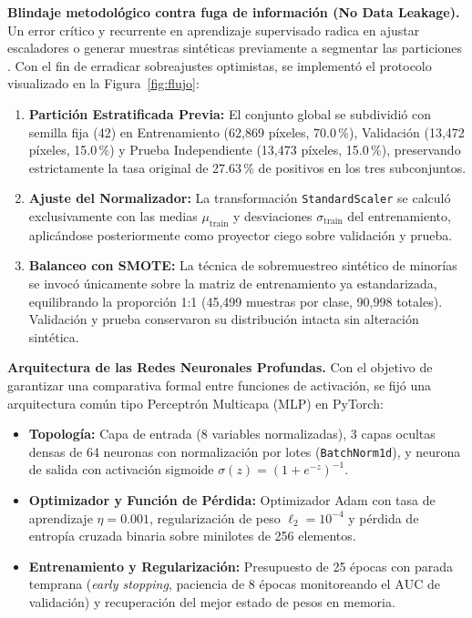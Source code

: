 \documentclass[10pt,twocolumn,letterpaper]{article}
\newcommand{\AUC}{\mathrm{AUC}}
\begin{document}
\textbf{Blindaje metodológico contra fuga de información (No Data Leakage).}
Un error crítico y recurrente en aprendizaje supervisado radica en ajustar escaladores o generar muestras sintéticas previamente a segmentar las particiones \citep{chawla2002}. Con el fin de erradicar sobreajustes optimistas, se implementó el protocolo visualizado en la Figura~\ref{fig:flujo}:
\begin{enumerate}[leftmargin=1.2em]
  \item \textbf{Partición Estratificada Previa:} El conjunto global se subdividió con semilla fija (42) en Entrenamiento (62{,}869 píxeles, 70.0\,\%), Validación (13{,}472 píxeles, 15.0\,\%) y Prueba Independiente (13{,}473 píxeles, 15.0\,\%), preservando estrictamente la tasa original de 27.63\,\% de positivos en los tres subconjuntos.
  \item \textbf{Ajuste del Normalizador:} La transformación \texttt{StandardScaler} se calculó exclusivamente con las medias $\mu_{\mathrm{train}}$ y desviaciones $\sigma_{\mathrm{train}}$ del entrenamiento, aplicándose posteriormente como proyector ciego sobre validación y prueba.
  \item \textbf{Balanceo con SMOTE:} La técnica de sobremuestreo sintético de minorías se invocó únicamente sobre la matriz de entrenamiento ya estandarizada, equilibrando la proporción 1:1 (45{,}499 muestras por clase, 90{,}998 totales). Validación y prueba conservaron su distribución intacta sin alteración sintética.
\end{enumerate}

\textbf{Arquitectura de las Redes Neuronales Profundas.}
Con el objetivo de garantizar una comparativa formal entre funciones de activación, se fijó una arquitectura común tipo Perceptrón Multicapa (MLP) en PyTorch:
\begin{itemize}[leftmargin=1.2em]
  \item \textbf{Topología:} Capa de entrada (8 variables normalizadas), 3 capas ocultas densas de 64 neuronas con normalización por lotes (\texttt{BatchNorm1d}), y neurona de salida con activación sigmoide $\sigma(z) = (1+e^{-z})^{-1}$.
  \item \textbf{Optimizador y Función de Pérdida:} Optimizador Adam \citep{kingma2014} con tasa de aprendizaje $\eta=0.001$, regularización de peso $\ell_2 = 10^{-4}$ y pérdida de entropía cruzada binaria sobre minilotes de 256 elementos.
  \item \textbf{Entrenamiento y Regularización:} Presupuesto de 25 épocas con parada temprana (\emph{early stopping}, paciencia de 8 épocas monitoreando el $\AUC$ de validación) y recuperación del mejor estado de pesos en memoria.
\end{itemize}
\end{document}

